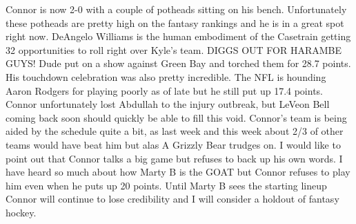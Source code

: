 \documentclass[11pt,letterpaper]{article}
\begin{document}
\par\noindent Connor is now 2-0 with a couple of potheads sitting on his bench. Unfortunately these potheads are pretty high on the fantasy rankings and he is in a great spot right now. DeAngelo Williams is the human embodiment of the Casetrain getting 32 opportunities to roll right over Kyle's team. DIGGS OUT FOR HARAMBE GUYS! Dude put on a show against Green Bay and torched them for 28.7 points. His touchdown celebration was also pretty incredible. The NFL is hounding Aaron Rodgers for playing poorly as of late but he still put up 17.4 points. Connor unfortunately lost Abdullah to the injury outbreak, but LeVeon Bell coming back soon should quickly be able to fill this void. Connor's team is being aided by the schedule quite a bit, as last week and this week about 2/3 of other teams would have beat him but alas A Grizzly Bear trudges on. I would like to point out that Connor talks a big game but refuses to back up his own words. I have heard so much about how Marty B is the GOAT but Connor refuses to play him even when he puts up 20 points. Until Marty B sees the starting lineup Connor will continue to lose credibility and I will consider a holdout of fantasy hockey.
\end{document}
